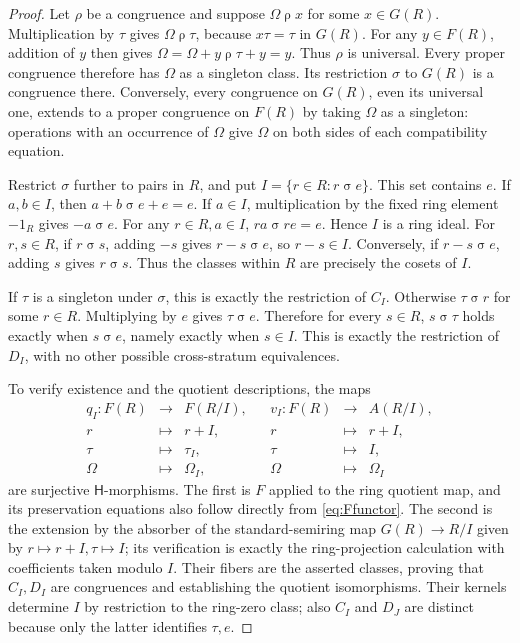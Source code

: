 \documentclass[11pt]{article}
\theoremstyle{definition}
\newcommand{\HH}{\mathsf H}
\newcommand{\Om}{\Omega}
\begin{document}
\begin{proof}
Let \(\rho\) be a congruence and suppose \(\Om\mathrel\rho x\) for
some \(x\in G(R)\). Multiplication by \(\tau\) gives
\(\Om\mathrel\rho\tau\), because \(x\tau=\tau\) in \(G(R)\).
For any \(y\in F(R)\), addition of \(y\) then gives
\(\Om=\Om+y\mathrel\rho\tau+y=y\). Thus \(\rho\) is universal.
Every proper congruence therefore has \(\Om\) as a singleton class.
Its restriction \(\sigma\) to \(G(R)\) is a congruence there. Conversely,
every congruence on \(G(R)\), even its universal one, extends to a
proper congruence on \(F(R)\) by taking \(\Om\) as a singleton: operations
with an occurrence of \(\Om\) give \(\Om\) on both sides of each
compatibility equation.

Restrict \(\sigma\) further to pairs in \(R\), and put
\(I=\{r\in R:r\mathrel\sigma e\}\). This set contains \(e\).
If \(a,b\in I\), then \(a+b\mathrel\sigma e+e=e\).
If \(a\in I\), multiplication by the fixed ring element \(-1_R\)
gives \(-a\mathrel\sigma e\). For any \(r\in R,a\in I\),
\(ra\mathrel\sigma re=e\). Hence \(I\) is a ring ideal. For
\(r,s\in R\), if \(r\mathrel\sigma s\), adding \(-s\) gives
\(r-s\mathrel\sigma e\), so \(r-s\in I\). Conversely, if
\(r-s\mathrel\sigma e\), adding \(s\) gives
\(r\mathrel\sigma s\). Thus the classes within \(R\) are precisely
the cosets of \(I\).

If \(\tau\) is a singleton under \(\sigma\), this is exactly the
restriction of \(C_I\). Otherwise \(\tau\mathrel\sigma r\) for
some \(r\in R\). Multiplying by \(e\) gives
\(\tau\mathrel\sigma e\). Therefore for every \(s\in R\),
\(s\mathrel\sigma\tau\) holds exactly when
\(s\mathrel\sigma e\), namely exactly when \(s\in I\).
This is exactly the restriction of \(D_I\), with no other possible
cross-stratum equivalences.

To verify existence and the quotient descriptions, the maps
\[
 \begin{array}{rclcrcl}
 q_I:F(R)&\longrightarrow&F(R/I),&&
 v_I:F(R)&\longrightarrow&A(R/I),\\
 r&\longmapsto&r+I,&&r&\longmapsto&r+I,\\
 \tau&\longmapsto&\tau_I,&&\tau&\longmapsto&I,\\
 \Om&\longmapsto&\Om_I,&&\Om&\longmapsto&\Om_I
 \end{array}
\]
are surjective \(\HH\)-morphisms. The first is \(F\) applied to the
ring quotient map, and its preservation equations also follow directly
from \eqref{eq:Ffunctor}. The second is the extension by the absorber
of the standard-semiring map \(G(R)\to R/I\) given by
\(r\mapsto r+I,\tau\mapsto I\); its verification is exactly the
ring-projection calculation with coefficients taken modulo \(I\).
Their fibers are the asserted classes, proving that \(C_I,D_I\) are
congruences and establishing the quotient isomorphisms. Their kernels
determine \(I\) by restriction to the ring-zero class; also \(C_I\)
and \(D_J\) are distinct because only the latter identifies \(\tau,e\).


\end{proof}
\end{document}
